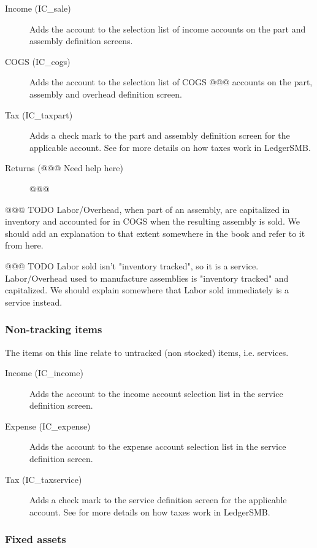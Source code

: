 \begin{description}
    \item[Income (IC\_sale)] Adds the account to the selection list of income accounts on the
    part and assembly definition screens.
    \item[COGS (IC\_cogs)] Adds the account to the selection list of COGS @@@ accounts on the
    part, assembly and overhead definition screen.
    \item[Tax (IC\_taxpart)] Adds a check mark to the part and assembly definition screen
    for the applicable account. See  for more details on how taxes
    work in LedgerSMB.
    \item[Returns (@@@ Need help here)] @@@
\end{description}

@@@ TODO Labor/Overhead, when part of an assembly, are capitalized in inventory and accounted for in COGS when the resulting assembly is sold. We should add an explanation to that extent somewhere in the book and refer to it from here.

@@@ TODO Labor sold isn't "inventory tracked", so it is a service. Labor/Overhead used to manufacture assemblies is "inventory tracked" and capitalized. We should explain somewhere that Labor sold immediately is a service instead.

\subsubsection{Non-tracking items}
\label{subsubsec-coa-non-tracking-items}

The items on this line relate to untracked (non stocked) items, i.e. services.

\begin{description}
    \item[Income (IC\_income)] Adds the account to the income account selection list in
    the service definition screen.
    \item[Expense (IC\_expense)] Adds the account to the expense account selection list in
    the service definition screen.
    \item[Tax (IC\_taxservice)] Adds a check mark to the service definition screen for the
    applicable account. See  for more details on how taxes work in LedgerSMB.
\end{description}

\subsubsection{Fixed assets}
\label{subsubsec-coa-fixed-assets}

